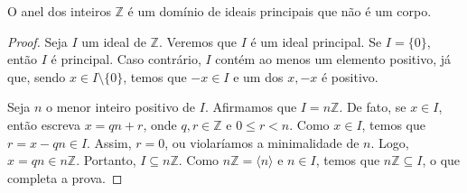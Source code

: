 \begin{prop} O anel dos inteiros $\mathbb Z$ é um domínio de ideais principais que não é um corpo.
\end{prop}
\begin{proof}
    Seja $I$ um ideal de $\mathbb Z$.
    Veremos que $I$ é um ideal principal.
    Se $I=\{0\}$, então $I$ é principal.
    Caso contrário, $I$ contém ao menos um elemento positivo, já que, sendo $x\in I\setminus\{0\}$, temos que $-x \in I$ e um dos $x, -x$ é positivo.

    Seja $n$ o menor inteiro positivo de $I$.
    Afirmamos que $I=n\mathbb Z$.
    De fato, se $x \in I$, então escreva $x=qn+r$, onde $q,r \in \mathbb Z$ e $0\leq r<n$.
    Como $x \in I$, temos que $r=x-qn \in I$. Assim, $r=0$, ou violaríamos a minimalidade de $n$.
    Logo, $x=qn\in n\mathbb Z$.
    Portanto, $I\subseteq n\mathbb Z$.
    Como $n\mathbb Z=\langle n\rangle$ e $n \in I$, temos que $n\mathbb Z\subseteq I$, o que completa a prova.
\end{proof}

